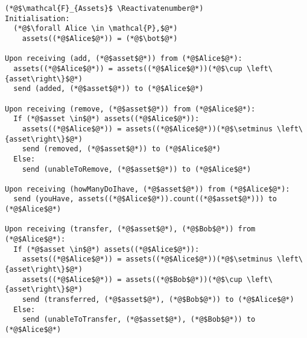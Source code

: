 \Suppressnumber
\begin{lstlisting}[label=assetsfunc, style=numbers]
(*@$\mathcal{F}_{Assets}$ \Reactivatenumber@*)
Initialisation:
  (*@$\forall Alice \in \mathcal{P},$@*)
    assets((*@$Alice$@*)) = (*@$\bot$@*)

Upon receiving (add, (*@$asset$@*)) from (*@$Alice$@*):
  assets((*@$Alice$@*)) = assets((*@$Alice$@*))(*@$\cup \left\{asset\right\}$@*)
  send (added, (*@$asset$@*)) to (*@$Alice$@*)

Upon receiving (remove, (*@$asset$@*)) from (*@$Alice$@*):
  If (*@$asset \in$@*) assets((*@$Alice$@*)):
    assets((*@$Alice$@*)) = assets((*@$Alice$@*))(*@$\setminus \left\{asset\right\}$@*)
    send (removed, (*@$asset$@*)) to (*@$Alice$@*)
  Else:
    send (unableToRemove, (*@$asset$@*)) to (*@$Alice$@*)

Upon receiving (howManyDoIhave, (*@$asset$@*)) from (*@$Alice$@*):
  send (youHave, assets((*@$Alice$@*)).count((*@$asset$@*))) to (*@$Alice$@*)

Upon receiving (transfer, (*@$asset$@*), (*@$Bob$@*)) from (*@$Alice$@*):
  If (*@$asset \in$@*) assets((*@$Alice$@*)):
    assets((*@$Alice$@*)) = assets((*@$Alice$@*))(*@$\setminus \left\{asset\right\}$@*)
    assets((*@$Alice$@*)) = assets((*@$Bob$@*))(*@$\cup \left\{asset\right\}$@*)
    send (transferred, (*@$asset$@*), (*@$Bob$@*)) to (*@$Alice$@*)
  Else:
    send (unableToTransfer, (*@$asset$@*), (*@$Bob$@*)) to (*@$Alice$@*)
\end{lstlisting}
